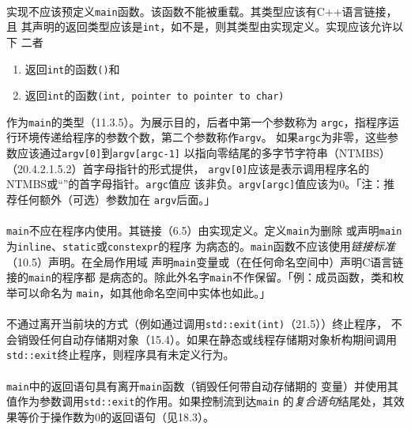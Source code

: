 \paragraph{}
实现不应该预定义\texttt{main}函数。该函数不能被重载。其类型应该有C++语言链接，且
其声明的返回类型应该是\texttt{int}，如不是，则其类型由实现定义。实现应该允许以下
二者
\begin{enumerate}
  \item{返回\texttt{int}的函数\texttt{()}和}
  \item{返回\texttt{int}的函数\texttt{(int, pointer to pointer to char)}}
\end{enumerate}
作为\texttt{main}的类型（11.3.5）。为展示目的，后者中第一个参数称为
\texttt{argc}，指程序运行环境传递给程序的参数个数，第二个参数称作\texttt{argv}。
如果\texttt{argc}为非零，这些参数应该通过\texttt{argv[0]}到\texttt{argv[argc-1]}
以指向零结尾的多字节字符串（NTMBS）（20.4.2.1.5.2）首字母指针的形式提供，
\texttt{argv[0]}应该是表示调用程序名的NTMBS或``''的首字母指针。\texttt{argc}值应
该非负。\texttt{argv[argc]}值应该为$0$。「注：推荐任何额外（可选）参数加在
\texttt{argv}后面。」

\paragraph{}
\texttt{main}不应在程序内使用。其链接（6.5）由实现定义。定义\texttt{main}为删除
或声明\texttt{main}为\texttt{inline}、\texttt{static}或\texttt{constexpr}的程序
为病态的。\texttt{main}函数不应该使用\textit{链接标准}（10.5）声明。在全局作用域
声明\texttt{main}变量或（在任何命名空间中）声明C语言链接的\texttt{main}的程序都
是病态的。除此外名字\texttt{main}不作保留。「例：成员函数，类和枚举可以命名为
\texttt{main}，如其他命名空间中实体也如此。」

\paragraph{}
不通过离开当前块的方式（例如通过调用\texttt{std::exit(int)}（21.5））终止程序，
不会销毁任何自动存储期对象（15.4）。如果在静态或线程存储期对象析构期间调用
\texttt{std::exit}终止程序，则程序具有未定义行为。

\paragraph{}
\texttt{main}中的返回语句具有离开\texttt{main}函数（销毁任何带自动存储期的
变量）并使用其值作为参数调用\texttt{std::exit}的作用。如果控制流到达\texttt{main}
的\textit{复合语句}结尾处，其效果等价于操作数为$0$的返回语句（见18.3）。


